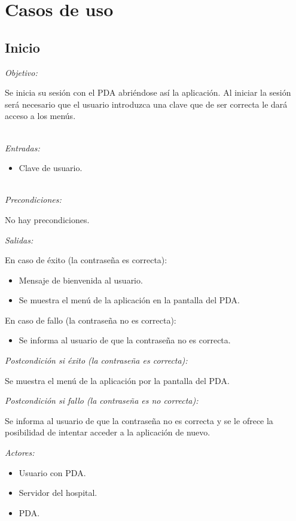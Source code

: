 \documentclass[12pt,a4paper,notitlepage,twoside]{report}
\begin{document}
\section{Casos de uso}
\subsection{Inicio}
\emph{Objetivo:}
\begin{description}
Se inicia su sesi\'on con el PDA abri\'endose as\'i la aplicaci\'on. Al iniciar la sesi\'on ser\'a necesario que el usuario introduzca una clave que de ser correcta le dar\'a acceso a los men\'us.
\end{description}
\\
\emph{Entradas:} 
\begin{itemize}
\item Clave de usuario.
\end{itemize}
\\
\emph{Precondiciones:}
\begin{description}
No hay precondiciones.
\end{description}
\emph{Salidas:}
\begin{description}
\item En caso de \'exito (la contrase\~na es correcta): 
\begin{itemize}
\item Mensaje de bienvenida al usuario. 
\item Se muestra el men\'u de la aplicaci\'on en la pantalla del PDA.
\end{itemize}
\item En caso de fallo (la contrase\~na no es correcta): 
\begin{itemize}
\item Se informa al usuario de que la contrase\~na no es correcta.
\end{itemize}
\end{description}
\emph{Postcondici\'on si \'exito (la contrase\~na es correcta):}
\begin{description}
Se muestra el men\'u de la aplicaci\'on por la pantalla del PDA.
\end{description}
\emph{Postcondici\'on si fallo (la contrase\~na es no correcta):}
\begin{description}
Se informa al usuario de que la contrase\~na no es correcta y se le ofrece la posibilidad de intentar acceder a la aplicaci\'on de nuevo.
\end{description}
\emph{Actores: }
\begin{itemize}
\item Usuario con PDA.
\item Servidor del hospital.
\item PDA.
\end{itemize}
\end{document}
